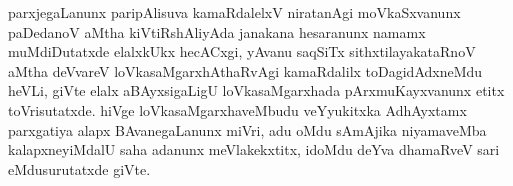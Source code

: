 parxjegaLanunx paripAlisuva kamaRdalelxV niratanAgi moVkaSxvanunx paDedanoV aMtha kiVtiRshAliyAda janakana hesaranunx namamx muMdiDutatxde elalxkUkx hecACxgi, yAvanu saqSiTx sithxtilayakataRnoV aMtha deVvareV loVkasaMgarxhAthaRvAgi kamaRdalilx toDagidAdxneMdu heVLi, giVte elalx aBAyxsigaLigU loVkasaMgarxhada pArxmuKayxvanunx etitx toVrisutatxde. hiVge loVkasaMgarxhaveMbudu veYyukitxka AdhAyxtamx parxgatiya alapx BAvanegaLanunx miVri, adu oMdu sAmAjika niyamaveMba kalapxneyiMdalU saha adanunx meVlakekxtitx, idoMdu deYva dhamaRveV sari eMdusurutatxde giVte.

\theendnotes
